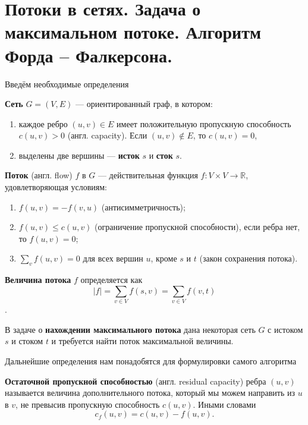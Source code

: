 \section{Потоки в сетях. Задача о максимальном потоке. Алгоритм Форда – Фалкерсона.}
Введём необходимые определения
\begin{definition}
\textbf{Сеть} $G = (V, E)$  --- ориентированный граф, в котором:
\begin{enumerate}
	\item каждое ребро $(u,v) \in E$
	имеет положительную пропускную способность $c(u, v) > 0$ (англ. capacity). Если $(u, v) \notin E$, то $c(u, v) = 0$,
	\item выделены две вершины --- \textbf{исток} $s$ и \textbf{сток} $s$.
\end{enumerate}
\end{definition}

\begin{definition}
	\textbf{Поток} (англ. flow) $f$ в $G$ --- действительная функция $f: V \times V \to \mathbb{R}$, удовлетворяющая условиям:
	\begin{enumerate}
		\item $f(u, v) = -f(v, u)$ (антисимметричность);
		\item $f(u, v) \le c(u, v)$ (ограничение пропускной способности), если ребра нет, то $f(u, v) = 0$;
		\item $\sum_v f(u, v) = 0$ для всех вершин $u$, кроме $s$ и $t$ (закон сохранения потока).
	\end{enumerate}
\end{definition}

\begin{definition}
	 \textbf{Величина потока} $f$ определяется как $$\displaystyle |f| = \sum_{v \in V} f(s, v) = \sum_{v \in V} f(v,t)$$.
\end{definition}


В задаче о \textbf{нахождении максимального потока} дана некоторая сеть $G$ с истоком $s$ и стоком $t$ и требуется найти поток максимальной величины.

Дальнейшие определения нам понадобятся для формулировки самого алгоритма
\begin{definition}
	\textbf{Остаточной пропускной способностью} (англ. residual capacity) ребра $(u,v)$ называется величина дополнительного потока, который мы можем направить из $u$ в $v$, не превысив пропускную способность $c(u,v)$. Иными словами
	$$c_f(u,v) = c(u,v) - f(u,v).$$
\end{definition}

